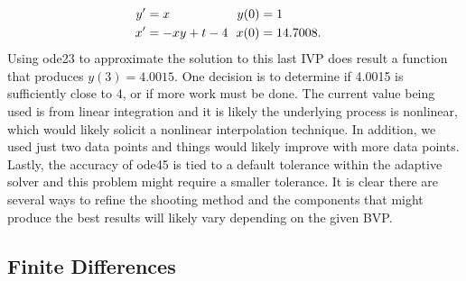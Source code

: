 \documentclass[twoside]{article}
\begin{document}
\begin{align*}
    y' &= x \ \ \ \ \ \ \ \ \ \ \ \ \ \ \ \ y(0)=1 \cr
    x' &= -xy+t-4 \ \ x(0)=14.7008.
\end{align*}
Using ode23 to approximate the solution to this last IVP does result a function that produces $y(3)=4.0015$. One decision is to determine if 4.0015 is sufficiently close to 4, or if more work must be done. The current value being used is from linear integration and it is likely the underlying process is nonlinear, which would likely solicit a nonlinear interpolation technique. In addition, we used just two data points and things would likely improve with more data points. Lastly, the accuracy of ode45 is tied to a default tolerance within the adaptive solver and this problem might require a smaller tolerance. It is clear there are several ways to refine the shooting method and the components that might produce the best results will likely vary depending on the given BVP.


\subsection{Finite Differences}
\end{document}
